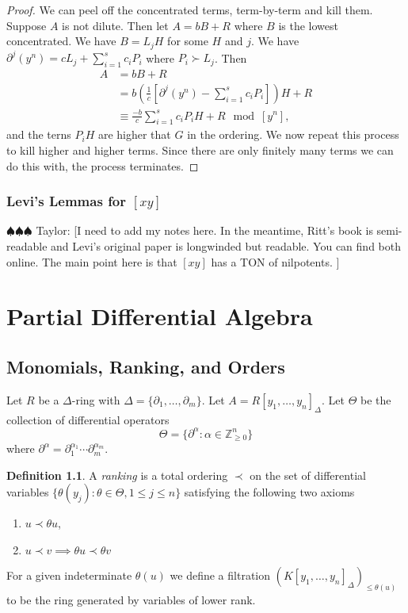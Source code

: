\documentclass[12pt]{book}
\newcommand{\taylor}[1]{{\color{blue} \sf $\spadesuit\spadesuit\spadesuit$ Taylor: [#1]}}
\numberwithin{equation}{section}
\theoremstyle{definition}
\newtheorem{definition}[theorem]{Definition}
\theoremstyle{remark}
\newcommand{\ZZ}{\mathbb{Z}}
\begin{document}
\begin{proof}
	We can peel off the concentrated terms, term-by-term and kill them. 
	Suppose $A$ is not dilute. 
	Then let $A=bB+R$ where $B$ is the lowest concentrated. 
	We have $B = L_j H$ for some $H$ and $j$. 
	We have $\partial^j(y^n) = cL_j + \sum_{i=1}^s c_i P_i$ where $P_i \succ L_j$. 
	Then 
	\begin{align*}
	A &= bB+R \\
	&= b \left( \frac{1}{c} \left[ \partial^j(y^n) - \sum_{i=1}^s c_i P_i \right] \right)H + R\\
	&\equiv \frac{-b}{c} \sum_{i=1}^s c_i P_i H + R \mod [y^n],
	\end{align*}
	and the terns $P_iH$ are higher that $G$ in the ordering. 
	We now repeat this process to kill higher and higher terms. 
	Since there are only finitely many terms we can do this with, the process terminates. 
\end{proof}

\subsection{Levi's Lemmas for $[xy]$}

\taylor{I need to add my notes here. In the meantime, Ritt's book is semi-readable and Levi's original paper is longwinded but readable. 
	You can find both online. 
	The main point here is that $[xy]$ has a TON of nilpotents.
}



\chapter{Partial Differential Algebra}


\section{Monomials, Ranking, and Orders}\label{S:PDE-ranking}
Let $R$ be a $\Delta$-ring with $\Delta = \lbrace \partial_1,\ldots,\partial_m \rbrace$.
Let $A = R[y_1,\ldots,y_n]_{\Delta}$. 
Let $\Theta$ be the collection of differential operators
$$ \Theta = \lbrace \partial^{\alpha} \colon \alpha \in \ZZ_{\geq 0}^n \rbrace$$
where $\partial^{\alpha} = \partial_1^{\alpha_1}\cdots \partial_m^{\alpha_m}$.
\begin{definition}
	A \emph{ranking} is a total ordering $\prec$ on the set of differential variables
	$ \lbrace \theta(y_j) \colon \theta \in \Theta, 1\leq j \leq n \rbrace $
	satisfying the following two axioms
	\begin{enumerate}[topsep=0pt]
		\item $ u \prec \theta u$, 
		\item $u \prec v \implies \theta u \prec \theta v $
	\end{enumerate}
\end{definition}
For a given indeterminate $\theta(u)$ we define a filtration $(K[y_1,\ldots,y_n]_{\Delta})_{\leq \theta(u)}$ to be the ring generated by variables of lower rank.
\end{document}

